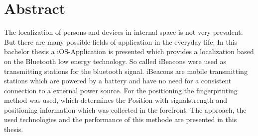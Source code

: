 \documentclass{AGTI}
\begin{document}
\vfill


\section*{Abstract}

The localization of persons and devices in internal space is not very prevalent. But there are many possible fields of application in the everyday life. In this bachelor thesis a iOS-Application is presented which provides a localization based on the Bluetooth low energy technology. So called iBeacons were used as transmitting stations for the bluetooth signal.
iBeacons are mobile transmitting stations which are powered by a battery and have no need for a consistent connection to a external power source. For the positioning the fingerprinting method was used, which determines the Position with signalstrength and positioning information which was collected in the forefront. The approach, the used technologies and the performance of this methode are presented in this thesis.


\cleardoublepage

%

\tableofcontents
\listoffigures

\cleardoublepage





%




\end{document}
